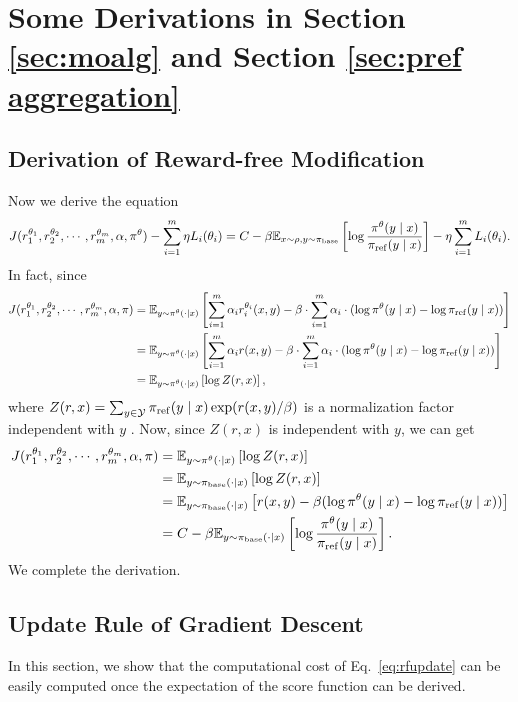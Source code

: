 \section{Some Derivations in Section \ref{sec:moalg} and Section \ref{sec:pref aggregation}}\label{app:derivation}
\subsection{Derivation of Reward-free Modification}
Now we derive the equation 
\begin{align*}
    J(r_1^{\theta_1}, r_2^{\theta_2}, \cdots, r_m^{\theta_m}, \alpha, \pi^\theta)-\sum_{i=1}^m \eta L_i(\theta_i)=C-\beta \mathbb{E}_{x\sim \rho, y\sim\pi_{\mathrm{base}}}\left[\log \frac{\pi^\theta(y\mid x)} { \pi_{\mathrm{ref}}(y\mid x)}\right]-\eta \sum_{i=1}^m L_i(\theta_i).
\end{align*}
In fact, since 
\begin{align*}J(r_1^{\theta_1}, r_2^{\theta_2},\cdots, r_m^{\theta_m},\alpha,\pi) &= \mathbb{E}_{y\sim\pi^\theta(\cdot \mid x)}\left[\sum_{i=1}^m \alpha_i r_i^{\theta_i}(x,y) - \beta\cdot \sum_{i=1}^m \alpha_i\cdot (\log \pi^\theta(y\mid x)-\log \pi_{\mathrm{ref}}(y\mid x))\right]\\
&=\mathbb{E}_{y\sim \pi^\theta(\cdot \mid x)}\left[\sum_{i=1}^m \alpha_ir(x,y) - \beta\cdot \sum_{i=1}^m \alpha_i\cdot (\log \pi^\theta(y\mid x)-\log \pi_{\mathrm{ref}}(y\mid x))\right]\\
&=\mathbb{E}_{y\sim \pi^\theta(\cdot \mid x)}\left[\log Z(r,x)\right],\end{align*}
where $Z(r,x) = \sum_{y \in \mathcal{Y}}\pi_{\mathrm{ref}}(y\mid x)\exp(r(x,y)/\beta)$ is a normalization factor independent with $y$ \citep{rafailov2024direct}. Now, since $Z(r,x)$ is independent with $y$, we can get 
\begin{align*}
    J(r_1^{\theta_1}, r_2^{\theta_2},\cdots, r_m^{\theta_m},\alpha,\pi) &=\mathbb{E}_{y\sim \pi^\theta(\cdot \mid x)}\left[\log Z(r,x)\right]\\
    &=\mathbb{E}_{y\sim \pi_{\mathrm{base}}(\cdot \mid x)}\left[\log Z(r,x)\right]\\
    &=\mathbb{E}_{y\sim \pi_{\mathrm{base}}(\cdot \mid x)}\left[r(x,y) - \beta (\log \pi^\theta(y\mid x)-\log \pi_{\mathrm{ref}}(y\mid x))\right]\\
    &=C-\beta \mathbb{E}_{y\sim \pi_{\mathrm{base}}(\cdot \mid x)}\left[\log \frac{\pi^\theta(y\mid x)}{\pi_{\mathrm{ref}}(y\mid x)}\right].
\end{align*}
We complete the derivation. 
\subsection{Update Rule of Gradient Descent}
In this section, we show that the computational cost of Eq.~\eqref{eq:rfupdate} can be easily computed once the expectation of the score function can be derived. 


